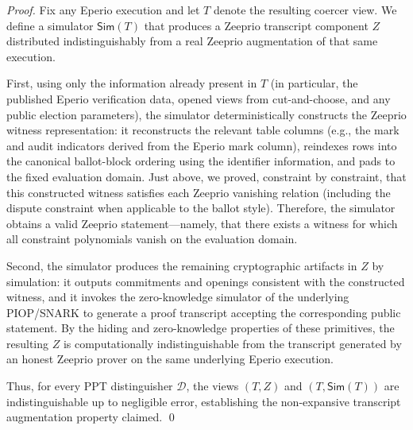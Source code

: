 \begin{proof}
Fix any Eperio execution and let $T$ denote the resulting coercer view. We define a simulator $\mathsf{Sim}(T)$ that
produces a Zeeprio transcript component $Z$ distributed indistinguishably from a real Zeeprio augmentation of that same
execution.

First, using only the information already present in $T$ (in particular, the published Eperio verification data, opened
views from cut-and-choose, and any public election parameters), the simulator deterministically constructs the Zeeprio
witness representation: it reconstructs the relevant table columns (e.g., the mark and audit indicators derived from the
Eperio mark column), reindexes rows into the canonical ballot-block ordering using the identifier information, and pads
to the fixed evaluation domain. Just above, we proved, constraint by constraint, that this
constructed witness satisfies each Zeeprio vanishing relation (including the dispute constraint when applicable to the
ballot style). Therefore, the simulator obtains a valid Zeeprio statement---namely, that there exists a witness for
which all constraint polynomials vanish on the evaluation domain.

Second, the simulator produces the remaining cryptographic artifacts in $Z$ by simulation: it outputs commitments and
openings consistent with the constructed witness, and it invokes the zero-knowledge simulator of the underlying
PIOP/SNARK to generate a proof transcript accepting the corresponding public statement. By the hiding and
zero-knowledge properties of these primitives, the resulting $Z$ is computationally indistinguishable from the transcript
generated by an honest Zeeprio prover on the same underlying Eperio execution.

Thus, for every PPT distinguisher $\mathcal{D}$, the views $(T,Z)$ and $(T,\mathsf{Sim}(T))$ are indistinguishable up to
negligible error, establishing the non-expansive transcript augmentation property claimed. \qed
\end{proof} 